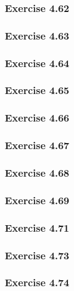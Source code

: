 \subsubsection{Exercise 4.62}

\subsubsection{Exercise 4.63}

\subsubsection{Exercise 4.64}

\subsubsection{Exercise 4.65}

\subsubsection{Exercise 4.66}

\subsubsection{Exercise 4.67}

\subsubsection{Exercise 4.68}

\subsubsection{Exercise 4.69}

\subsubsection{Exercise 4.71}

\subsubsection{Exercise 4.73}

\subsubsection{Exercise 4.74}


